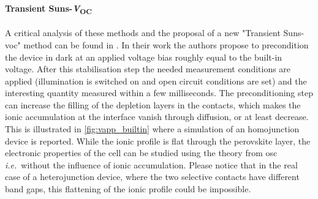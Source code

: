 		\begin{figure}
		\end{figure}

		\paragraph{Transient Suns-\textit{V}\textsubscript{OC}}\label{transient_suns_voc}
		A critical analysis of these methods and the proposal of a new "Transient Suns-\gls{voc}" method can be found in .
		In their work the authors propose to precondition the device in dark at an applied voltage bias roughly equal to the built-in voltage.
		After this stabilisation step the needed measurement conditions are applied (illumination is switched on and open circuit conditions are set) and the interesting quantity measured within a few milliseconds.
		The preconditioning step can increase the filling of the depletion layers in the contacts, which makes the ionic accumulation at the interface vanish through diffusion, or at least decrease.
		This is illustrated in \cref{fig:vapp_builtin} where a simulation of an homojunction device is reported.
		While the ionic profile is flat through the perovskite layer, the electronic properties of the cell can be studied using the theory from \gls{osc} \textsl{i.e.}\ without the influence of ionic accumulation.
		Please notice that in the real case of a heterojunction device, where the two selective contacts have different band gaps, this flattening of the ionic profile could be impossible.


